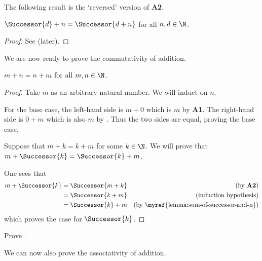 The following result is the `reversed' version of \textbf{A2}.

\begin{lemma}\label{lemma:sum-of-successor-and-n}
    $\Successor{d} + n = \Successor{d + n}$ for all $n, d \in \N$.
\end{lemma}
\begin{proof}
    See  (later).
\end{proof}

We are now ready to prove the commutativity of addition.

\begin{theorem}\label{theorem:addition-commutative-naturals}
    $m + n = n + m$ for all $m, n \in \N$.
\end{theorem}
\begin{proof}
    Take $m$ as an arbitrary natural number. We will induct on $n$.

    For the base case, the left-hand side is $m + 0$ which is $m$ by \textbf{A1}. The right-hand side is $0 + m$ which is also $m$ by . Thus the two sides are equal, proving the base case.

    Suppose that $m + k = k + m$ for some $k \in \N$. We will prove that $m + \Successor{k} = \Successor{k} + m$.

    One sees that
    \begin{align*}
        m + \Successor{k} &= \Successor{m + k} & (\text{by \textbf{A2}})\\
        &= \Successor{k + m} & (\text{induction hypothesis})\\
        &= \Successor{k} + m & (\text{by \myref{lemma:sum-of-successor-and-n}})
    \end{align*}
    which proves the case for $\Successor{k}$.
\end{proof}

\begin{exercise}\label{exercise:sum-of-successor-and-n}
    Prove .
\end{exercise}

We can now also prove the associativity of addition.


